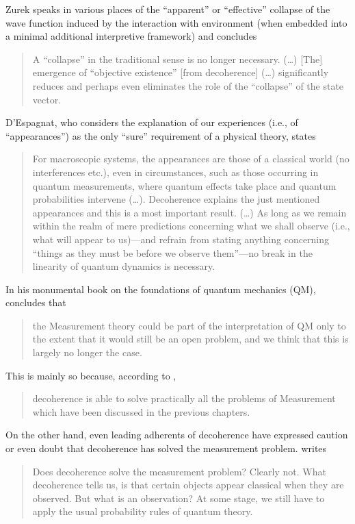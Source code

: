 \documentclass[rmp,aps,amsmath,amsfonts,noshowkeys,noshowpacs,12pt]{revtex4}
\begin{document}
%
Zurek speaks in various places of the ``apparent'' or ``effective''
collapse of the wave function induced by the interaction with
environment (when embedded into a minimal additional interpretive
framework) and concludes \citep[p.~1793]{Zurek:1998:re}
%
\begin{quote} {\small 
    A ``collapse'' in the traditional sense is no
    longer necessary.  (\dots) [The] emergence of ``objective
    existence'' [from decoherence] (\dots) significantly reduces and
    perhaps even eliminates the role of the ``collapse'' of the state
    vector.
}\end{quote}
%
D'Espagnat, who considers the explanation of our experiences (i.e., of
``appearances'') as the only ``sure'' requirement of a physical
theory, states \citep[p.~136]{Espagnat:2000:uy}
%
\begin{quote} {\small For macroscopic systems, the appearances are
    those of a classical world (no interferences etc.), even in
    circumstances, such as those occurring in quantum measurements,
    where quantum effects take place and quantum probabilities
    intervene (\dots).  Decoherence explains the just mentioned
    appearances and this is a most important result. (\dots) As long
    as we remain within the realm of mere predictions concerning what
    we shall observe (i.e., what will appear to us)---and refrain from
    stating anything concerning ``things as they must be before we
    observe them''---no break in the linearity of quantum dynamics is
    necessary.
}\end{quote}
%
In his monumental book on the foundations of quantum mechanics (QM),
\citet[p.~791]{Auletta:2000:rv} concludes that
%
\begin{quote} {\small
the Measurement theory could be part of the interpretation of QM only
to the extent that it would still be an open problem, and we think
that this is largely no longer the case.
}\end{quote}
%
This is mainly so because, according to
\citet[p.~289]{Auletta:2000:rv},
%
\begin{quote} {\small
decoherence is able to solve practically all the problems of
Measurement which have been discussed in the previous chapters.
}\end{quote}
%
On the other hand, even leading adherents of decoherence have
expressed caution or even doubt that decoherence has solved the
measurement problem.  \citet[p.~14]{Joos:1999:po} writes
%
\begin{quote} {\small Does decoherence solve the measurement problem?
    Clearly not. What decoherence tells us, is that certain objects
    appear classical when they are observed. But what is an
    observation? At some stage, we still have to apply the usual
    probability rules of quantum theory.
}\end{quote}
\end{document}
